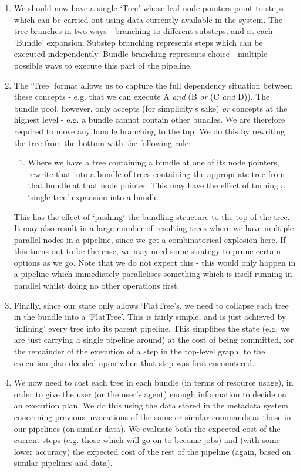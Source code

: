 \documentclass[10pt,a4paper]{article}
\begin{document}
\begin{appendices}
\begin{enumerate}
\item We should now have a single `Tree' whose leaf node pointers point to steps which can be carried out using data currently available in the system. The tree branches in two ways - branching to different substeps, and at each `Bundle' expansion. Substep branching represents steps which can be executed independently. Bundle branching represents choice - multiple possible ways to execute this part of the pipeline.
\item The `Tree' format allows us to capture the full dependency situation between these concepts - e.g. that we can execute A \textit{and} (B \textit{or} (C \textit{and} D)). The bundle pool, however, only accepts (for simplicity's sake) \textit{or} concepts at the highest level - e.g. a bundle cannot contain other bundles. We are therefore required to move any bundle branching to the top. We do this by rewriting the tree from the bottom with the following rule:
\begin{enumerate}
\item Where we have a tree containing a bundle at one of its node pointers, rewrite that into a bundle of trees containing the appropriate tree from that bundle at that node pointer. This may have the effect of turning a `single tree' expansion into a bundle.
\end{enumerate}
This has the effect of `pushing` the bundling structure to the top of the tree. It may also result in a large number of resulting trees where we have multiple parallel nodes in a pipeline, since we get a combinatorical explosion here. If this turns out to be the case, we may need some strategy to prune certain options as we go. Note that we do not expect this - this would only happen in a pipeline which immediately parallelises something which is itself running in parallel whilst doing no other operations first.
\item Finally, since our state only allows `FlatTree's, we need to collapse each tree in the bundle into a `FlatTree'. This is fairly simple, and is just achieved by `inlining' every tree into its parent pipeline. This simplifies the state (e.g. we are just carrying a single pipeline around) at the cost of being committed, for the remainder of the execution of a step in the top-level graph, to the execution plan decided upon when that step was first encountered.
\item We now need to cost each tree in each bundle (in terms of resource usage), in order to give the user (or the user's agent) enough information to decide on an execution plan. We do this using the data stored in the metadata system concerning previous invocations of the same or similar commands as those in our pipelines (on similar data). We evaluate both the expected cost of the current steps (e.g. those which will go on to become jobs) and (with some lower accuracy) the expected cost of the rest of the pipeline (again, based on similar pipelines and data).
\end{enumerate}

\end{appendices}
\end{document}
